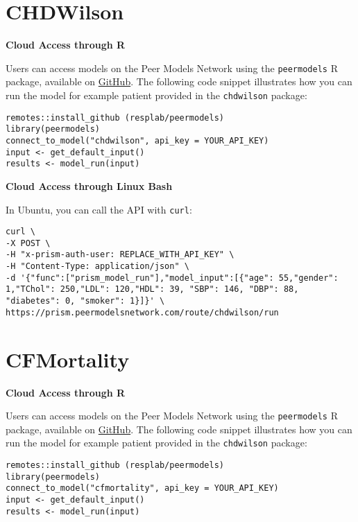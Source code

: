 \documentclass[
]{book}
\begin{document}
\hypertarget{chdwilson-1}{%
\section{CHDWilson}\label{chdwilson-1}}

\textbf{Cloud Access through R}

Users can access models on the Peer Models Network using the \texttt{peermodels} R package, available on \href{https://github.com/resplab/peermodels}{GitHub}. The following code snippet illustrates how you can run the model for example patient provided in the \texttt{chdwilson} package:

\begin{verbatim}
remotes::install_github (resplab/peermodels)
library(peermodels)
connect_to_model("chdwilson", api_key = YOUR_API_KEY)
input <- get_default_input()
results <- model_run(input)
\end{verbatim}

\textbf{Cloud Access through Linux Bash}

In Ubuntu, you can call the API with \texttt{curl}:

\begin{verbatim}
curl \
-X POST \
-H "x-prism-auth-user: REPLACE_WITH_API_KEY" \
-H "Content-Type: application/json" \
-d '{"func":["prism_model_run"],"model_input":[{"age": 55,"gender": 1,"TChol": 250,"LDL": 120,"HDL": 39, "SBP": 146, "DBP": 88, "diabetes": 0, "smoker": 1}]}' \
https://prism.peermodelsnetwork.com/route/chdwilson/run
\end{verbatim}

\hypertarget{cfmortality-1}{%
\section{CFMortality}\label{cfmortality-1}}

\textbf{Cloud Access through R}

Users can access models on the Peer Models Network using the \texttt{peermodels} R package, available on \href{https://github.com/resplab/peermodels}{GitHub}. The following code snippet illustrates how you can run the model for example patient provided in the \texttt{chdwilson} package:

\begin{verbatim}
remotes::install_github (resplab/peermodels)
library(peermodels)
connect_to_model("cfmortality", api_key = YOUR_API_KEY)
input <- get_default_input()
results <- model_run(input)
\end{verbatim}
\end{document}
